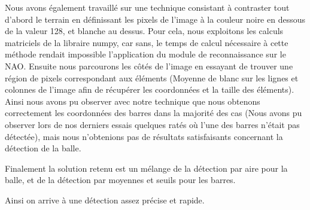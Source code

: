 \par Nous avons également travaillé sur une
technique consistant à contraster tout
d'abord le terrain en définissant les pixels de l'image à la couleur noire en
dessous de la valeur 128, et blanche au dessus. Pour cela, nous exploitons les calculs matriciels de la libraire numpy, car sans, le temps de calcul nécessaire à cette méthode rendait impossible l’application du module de reconnaissance sur le NAO. Ensuite nous parcourons les
côtés de l'image en essayant de trouver une région de pixels correspondant aux
éléments (Moyenne de blanc sur les lignes et colonnes de l'image afin de récupérer les
coordonnées et la taille des éléments). Ainsi nous avons pu observer avec notre
technique que nous obtenons correctement les coordonnées des barres dans la
majorité des cas (Nous avons pu observer lors de nos derniers essais quelques
ratés où l'une des barres n'était pas détectée), mais nous n'obtenions pas de
résultats satisfaisants concernant la détection de la balle.

\par Finalement la solution retenu est un mélange de la détection par aire pour
la balle, et de la détection par moyennes et seuils pour les barres.
\par Ainsi on arrive à une détection assez précise et rapide.
